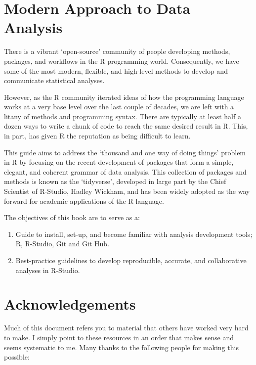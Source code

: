 \documentclass[]{book}
\begin{document}
\section{Modern Approach to Data
Analysis}\label{modern-approach-to-data-analysis}

There is a vibrant `open-source' community of people developing methods,
packages, and workflows in the R programming world. Consequently, we
have some of the most modern, flexible, and high-level methods to
develop and communicate statistical analyses.

However, as the R community iterated ideas of how the programming
language works at a very base level over the last couple of decades, we
are left with a litany of methods and programming syntax. There are
typically at least half a dozen ways to write a chunk of code to reach
the same desired result in R. This, in part, has given R the reputation
as being difficult to learn.

This guide aims to address the `thousand and one way of doing things'
problem in R by focusing on the recent development of packages that form
a simple, elegant, and coherent grammar of data analysis. This
collection of packages and methods is known as the `tidyverse',
developed in large part by the Chief Scientist of R-Studio, Hadley
Wickham, and has been widely adopted as the way forward for academic
applications of the R language.

The objectives of this book are to serve as a:

\begin{enumerate}
\def\labelenumi{\arabic{enumi})}
\item
  Guide to install, set-up, and become familiar with analysis
  development tools; R, R-Studio, Git and Git Hub.
\item
  Best-practice guidelines to develop reproducible, accurate, and
  collaborative analyses in R-Studio.
\end{enumerate}

\section{Acknowledgements}\label{acknowledgements}

Much of this document refers you to material that others have worked
very hard to make. I simply point to these resources in an order that
makes sense and seems systematic to me. Many thanks to the following
people for making this possible:
\end{document}
